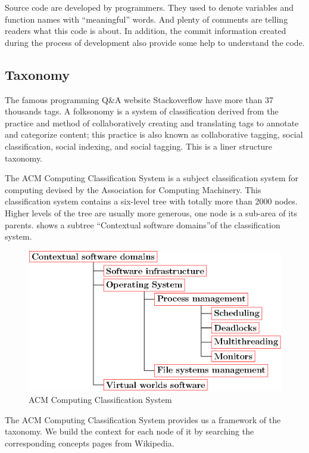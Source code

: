 Source code are developed by programmers. They used to
denote variables and function names with ``meaningful'' words. And plenty of comments
are telling readers what this code is about. In addition, the commit information created
during the process of development also provide some help to understand the code.


\subsection{Taxonomy}
\label{sec:taxonomy}
The famous programming Q\&A website Stackoverflow have more than 37 thousands
tags. A folksonomy is a system of classification derived from the practice and
method of collaboratively creating and translating tags to annotate and categorize
content; this practice is also known as collaborative tagging, social classification,
social indexing, and social tagging.  This is a liner structure taxonomy.

The ACM Computing Classification System\cite{acmurl} is a subject classification
system for computing devised by the Association for Computing Machinery. This
classification system contains a six-level tree with totally more than 2000 nodes.
Higher levels of the tree are usually more generous, one node is a sub-area of its
parents.
 shows a subtree ``Contextual software domains''of the
classification system.
\begin{figure}[h]
\begin{center}
\includegraphics[width=0.9\columnwidth]{figure/acm.eps}
\caption{ACM Computing Classification System}
\label{fig:acm}
\end{center}
\end{figure}

The ACM Computing Classification System provides us a framework of the
taxonomy. We build the context for each node of it by searching the
corresponding concepts pages from Wikipedia.
